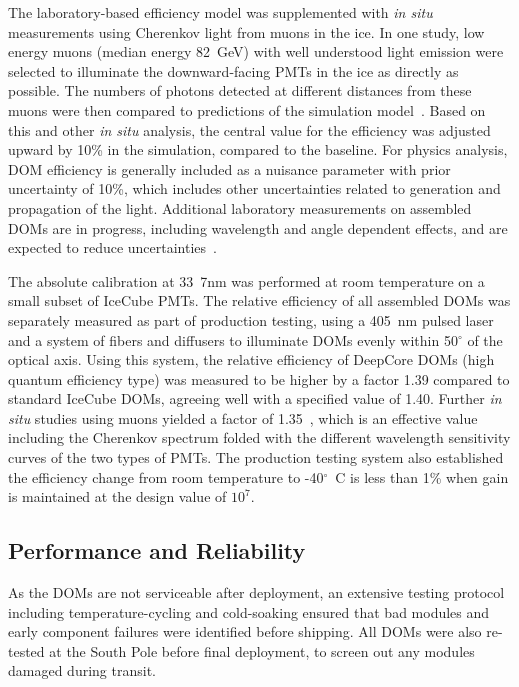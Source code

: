 The laboratory-based efficiency model was supplemented with \textit{in situ} measurements using Cherenkov light from muons in the ice.  In one study, low energy muons (median energy 82~GeV) with well understood light emission were selected to illuminate the downward-facing PMTs in the ice as directly as possible. The numbers of photons detected at different distances from these muons were then compared to predictions of the simulation model~\cite{IC3:ereco}.  Based on this and other \textit{in situ}  analysis, the central value for the efficiency was adjusted upward by 10\% in the simulation, compared to the baseline.  For physics analysis, DOM efficiency is generally included as a nuisance parameter with prior uncertainty of 10\%,  which includes other uncertainties related to generation and propagation of the light. Additional laboratory measurements on assembled DOMs are in progress, including wavelength and angle dependent effects, and are expected to reduce uncertainties~\cite{ICECUBE:DOMEFF}.

The absolute calibration at 33~7nm was performed at room temperature
on a small subset of IceCube PMTs. The relative efficiency of all
assembled DOMs was separately measured as part of production testing,
using a 405~nm pulsed laser and a system of fibers and diffusers to
illuminate DOMs evenly within 50$^{\circ}$ of the optical axis.  Using
this system, the relative efficiency of DeepCore DOMs (high quantum
efficiency type) was measured to be higher by a factor 1.39 compared
to standard IceCube DOMs, agreeing well with a specified value of
1.40. Further \textit{in situ}  studies using muons yielded a factor of
1.35~\cite{ICECUBE:DC}, which is an effective value including the
Cherenkov spectrum folded with the different wavelength sensitivity
curves of the two types of PMTs.  The production testing system also
established the efficiency change from room temperature to
-40$^{\circ}$~C is less than 1\% when gain is maintained at the design value of $10^7$.  


\subsection{Performance and Reliability}

As the DOMs are not serviceable after deployment, an extensive testing
protocol including temperature-cycling and cold-soaking ensured that bad
modules and early component failures were identified before shipping.
All DOMs were also re-tested at the South Pole before final deployment, to
screen out any modules damaged during transit.

